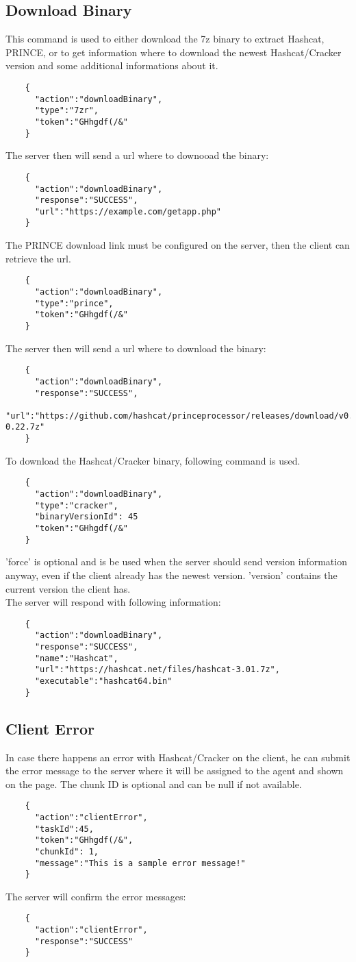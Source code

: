 \documentclass{article}
\begin{document}
	\subsection*{Download Binary}
	This command is used to either download the 7z binary to extract Hashcat, PRINCE, or to get information where to download the newest Hashcat/Cracker version and some additional informations about it.
	\begin{verbatim}
	{
	  "action":"downloadBinary",
	  "type":"7zr",
	  "token":"GHhgdf(/&"
	}
	\end{verbatim}
	The server then will send a url where to downooad the binary:
	\begin{verbatim}
	{
	  "action":"downloadBinary",
	  "response":"SUCCESS",
	  "url":"https://example.com/getapp.php"
	}
	\end{verbatim}
	The PRINCE download link must be configured on the server, then the client can retrieve the url.
	\begin{verbatim}
	{
	  "action":"downloadBinary",
	  "type":"prince",
	  "token":"GHhgdf(/&"
	}
	\end{verbatim}
	The server then will send a url where to download the binary:
	\begin{verbatim}
	{
	  "action":"downloadBinary",
	  "response":"SUCCESS",
	  "url":"https://github.com/hashcat/princeprocessor/releases/download/v0.22/princeprocessor-0.22.7z"
	}
	\end{verbatim}
	To download the Hashcat/Cracker binary, following command is used.
	\begin{verbatim}
	{
	  "action":"downloadBinary",
	  "type":"cracker",
	  "binaryVersionId": 45
	  "token":"GHhgdf(/&"
	}
	\end{verbatim}
	'force' is optional and is be used when the server should send version information anyway, even if the client already has the newest version. 'version' contains the current version the client has.\\
	The server will respond with following information:
	\begin{verbatim}
	{
	  "action":"downloadBinary",
	  "response":"SUCCESS",
	  "name":"Hashcat",
	  "url":"https://hashcat.net/files/hashcat-3.01.7z",
	  "executable":"hashcat64.bin"
	}
	\end{verbatim}
	
	\subsection*{Client Error}
	In case there happens an error with Hashcat/Cracker on the client, he can submit the error message to the server where it will be assigned to the agent and shown on the page. The chunk ID is optional and can be null if not available.
	\begin{verbatim}
	{
	  "action":"clientError",
	  "taskId":45,
	  "token":"GHhgdf(/&",
	  "chunkId": 1,
	  "message":"This is a sample error message!"
	}
	\end{verbatim}
	The server will confirm the error messages:
	\begin{verbatim}
	{
	  "action":"clientError",
	  "response":"SUCCESS"
	}
	\end{verbatim}
	
\end{document}
